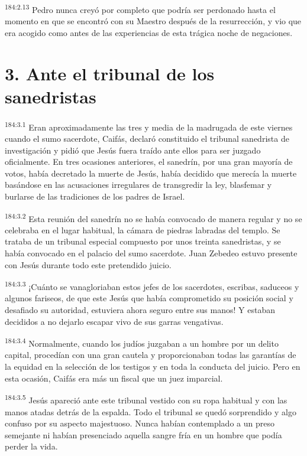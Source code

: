 \par 
\textsuperscript{184:2.13} Pedro nunca creyó por completo que podría ser perdonado hasta el momento en que se encontró con su Maestro después de la resurrección, y vio que era acogido como antes de las experiencias de esta trágica noche de negaciones.

\section*{3. Ante el tribunal de los sanedristas}
\par 
\textsuperscript{184:3.1} Eran aproximadamente las tres y media de la madrugada de este viernes cuando el sumo sacerdote, Caifás, declaró constituido el tribunal sanedrista de investigación y pidió que Jesús fuera traído ante ellos para ser juzgado oficialmente. En tres ocasiones anteriores, el sanedrín, por una gran mayoría de votos, había decretado la muerte de Jesús, había decidido que merecía la muerte basándose en las acusaciones irregulares de transgredir la ley, blasfemar y burlarse de las tradiciones de los padres de Israel.

\par 
\textsuperscript{184:3.2} Esta reunión del sanedrín no se había convocado de manera regular y no se celebraba en el lugar habitual, la cámara de piedras labradas del templo. Se trataba de un tribunal especial compuesto por unos treinta sanedristas, y se había convocado en el palacio del sumo sacerdote. Juan Zebedeo estuvo presente con Jesús durante todo este pretendido juicio.

\par 
\textsuperscript{184:3.3} ¡Cuánto se vanagloriaban estos jefes de los sacerdotes, escribas, saduceos y algunos fariseos, de que este Jesús que había comprometido su posición social y desafiado su autoridad, estuviera ahora seguro entre sus manos! Y estaban decididos a no dejarlo escapar vivo de sus garras vengativas.

\par 
\textsuperscript{184:3.4} Normalmente, cuando los judíos juzgaban a un hombre por un delito capital, procedían con una gran cautela y proporcionaban todas las garantías de la equidad en la selección de los testigos y en toda la conducta del juicio. Pero en esta ocasión, Caifás era más un fiscal que un juez imparcial.

\par 
\textsuperscript{184:3.5} Jesús apareció ante este tribunal vestido con su ropa habitual y con las manos atadas detrás de la espalda. Todo el tribunal se quedó sorprendido y algo confuso por su aspecto majestuoso. Nunca habían contemplado a un preso semejante ni habían presenciado aquella sangre fría en un hombre que podía perder la vida.

